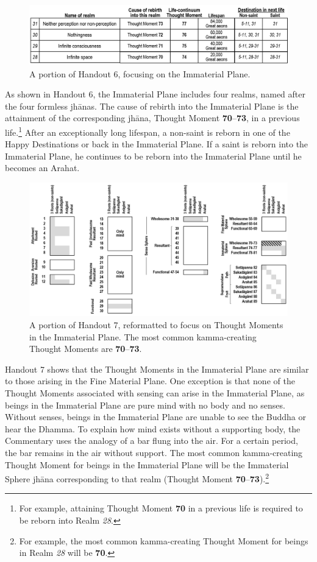 \begin{figure}[h]
\centering
\includegraphics[width=0.9\linewidth]{./Diagrams/Immaterial1}
\caption{A portion of Handout 6, focusing on the Immaterial Plane.}
\label{fig:Immaterial1}
\end{figure}

As shown in Handout 6, the Immaterial Plane includes four realms, named after the four formless jhānas. The cause of rebirth into the Immaterial Plane is the attainment of the corresponding jhāna, Thought Moment \textbf{70}--\textbf{73}, in a previous life.\footnote{For example, attaining Thought Moment \textbf{70} in a previous life is required to be reborn into Realm \textit{28}.} After an exceptionally long lifespan, a non-saint is reborn in one of the Happy Destinations or back in the Immaterial Plane. If a saint is reborn into the Immaterial Plane, he continues to be reborn into the Immaterial Plane until he becomes an Arahat.

\begin{figure}[h]
\centering
\includegraphics[width=1\linewidth]{./Diagrams/Immaterial}
\caption{A portion of Handout 7, reformatted to focus on Thought Moments in the Immaterial Plane. The most common kamma-creating Thought Moments are \textbf{70}--\textbf{73}.}
\label{fig:Immaterial}
\end{figure}

Handout 7 shows that the Thought Moments in the Immaterial Plane are similar to those arising in the Fine Material Plane. One exception is that none of the Thought Moments associated with sensing can arise in the Immaterial Plane, as beings in the Immaterial Plane are pure mind with no body and no senses. Without senses, beings in the Immaterial Plane are unable to see the Buddha or hear the Dhamma. To explain how mind exists without a supporting body, the Commentary uses the analogy of a bar flung into the air. For a certain period, the bar remains in the air without support. The most common kamma-creating Thought Moment for beings in the Immaterial Plane will be the Immaterial Sphere jhāna corresponding to that realm (Thought Moment \textbf{70}--\textbf{73}).\footnote{For example, the most common kamma-creating Thought Moment for beings in Realm \textit{28} will be \textbf{70}.}

